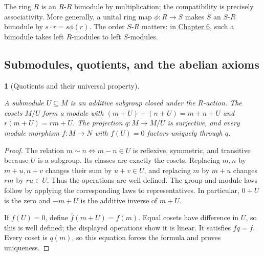 \documentclass[11pt,a4paper]{article}
\newcommand{\mathheading}{}
\theoremstyle{plain}
\newtheorem*{plainstatement}{\mathheading}
\theoremstyle{definition}
\newenvironment{mathstatement}[3]{\renewcommand{\mathheading}{#1 #2}\begin{plainstatement}[#3]}{\end{plainstatement}}
\begin{document}
The ring \(R\) is an \(R\)-\(R\) bimodule by multiplication; the compatibility is precisely associativity. More generally, a unital ring map \(\phi:R\to S\) makes \(S\) an \(S\)-\(R\) bimodule by \(s\cdot r=s\phi(r)\). The order \(S\)-\(R\) matters: in \hyperref[chapter-06]{Chapter 6}, such a bimodule takes left \(R\)-modules to left \(S\)-modules.

 
\subsection{Submodules, quotients, and the abelian axioms}
\label{quotients}
 
\begin{mathstatement}{Proposition}{5.4}{Quotients and their universal property}
\label{env-5-4}

A \emph{submodule} \(U\subseteq M\) is an additive subgroup closed under the \(R\)-action. The cosets \(M/U\) form a module with \((m+U)+(n+U)=m+n+U\) and \(r(m+U)=rm+U\). The projection \(q:M\to M/U\) is surjective, and every module morphism \(f:M\to N\) with \(f(U)=0\) factors uniquely through \(q\).


\par{}\par

\end{mathstatement}
 
\begin{proof}

The relation \(m\sim n\iff m-n\in U\) is reflexive, symmetric, and transitive because \(U\) is a subgroup. Its classes are exactly the cosets. Replacing \(m,n\) by \(m+u,n+v\) changes their sum by \(u+v\in U\), and replacing \(m\) by \(m+u\) changes \(rm\) by \(ru\in U\). Thus the operations are well defined. The group and module laws follow by applying the corresponding laws to representatives. In particular, \(0+U\) is the zero and \(-m+U\) is the additive inverse of \(m+U\).


If \(f(U)=0\), define \(\bar f(m+U)=f(m)\). Equal cosets have difference in \(U\), so this is well defined; the displayed operations show it is linear. It satisfies \(\bar f q=f\). Every coset is \(q(m)\), so this equation forces the formula and proves uniqueness.


\end{proof}
 
\end{document}
